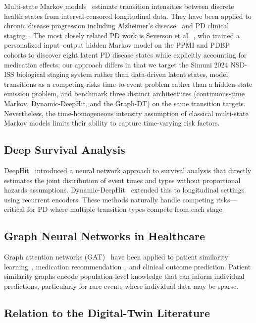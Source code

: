 Multi-state Markov models~\cite{jackson2011} estimate transition intensities between discrete health states from interval-censored longitudinal data. They have been applied to chronic disease progression including Alzheimer's disease~\cite{cook2018} and PD clinical staging~\cite{ypma2022}. The most closely related PD work is Severson et al.~\cite{severson2021}, who trained a personalized input--output hidden Markov model on the PPMI and PDBP cohorts to discover eight latent PD disease states while explicitly accounting for medication effects; our approach differs in that we target the Simuni 2024 NSD-ISS biological staging system rather than data-driven latent states, model transitions as a competing-risks time-to-event problem rather than a hidden-state emission problem, and benchmark three distinct architectures (continuous-time Markov, Dynamic-DeepHit, and the Graph-DT) on the same transition targets. Nevertheless, the time-homogeneous intensity assumption of classical multi-state Markov models limits their ability to capture time-varying risk factors.

\subsection{Deep Survival Analysis}

DeepHit~\cite{lee2018} introduced a neural network approach to survival analysis that directly estimates the joint distribution of event times and types without proportional hazards assumptions. Dynamic-DeepHit~\cite{lee2019} extended this to longitudinal settings using recurrent encoders. These methods naturally handle competing risks---critical for PD where multiple transition types compete from each stage.

\subsection{Graph Neural Networks in Healthcare}

Graph attention networks (GAT)~\cite{velickovic2018} have been applied to patient similarity learning~\cite{adamedgraph}, medication recommendation~\cite{shang2019}, and clinical outcome prediction. Patient similarity graphs encode population-level knowledge that can inform individual predictions, particularly for rare events where individual data may be sparse.

\subsection{Relation to the Digital-Twin Literature}

